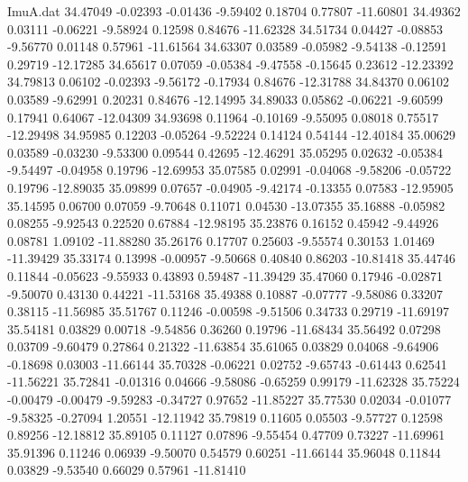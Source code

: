 \begin{filecontents}{ImuA.dat}
  34.47049   -0.02393   -0.01436   -9.59402    0.18704    0.77807  -11.60801
  34.49362    0.03111   -0.06221   -9.58924    0.12598    0.84676  -11.62328
  34.51734    0.04427   -0.08853   -9.56770    0.01148    0.57961  -11.61564
  34.63307    0.03589   -0.05982   -9.54138   -0.12591    0.29719  -12.17285
  34.65617    0.07059   -0.05384   -9.47558   -0.15645    0.23612  -12.23392
  34.79813    0.06102   -0.02393   -9.56172   -0.17934    0.84676  -12.31788
  34.84370    0.06102    0.03589   -9.62991    0.20231    0.84676  -12.14995
  34.89033    0.05862   -0.06221   -9.60599    0.17941    0.64067  -12.04309
  34.93698    0.11964   -0.10169   -9.55095    0.08018    0.75517  -12.29498
  34.95985    0.12203   -0.05264   -9.52224    0.14124    0.54144  -12.40184
  35.00629    0.03589   -0.03230   -9.53300    0.09544    0.42695  -12.46291
  35.05295    0.02632   -0.05384   -9.54497   -0.04958    0.19796  -12.69953
  35.07585    0.02991   -0.04068   -9.58206   -0.05722    0.19796  -12.89035
  35.09899    0.07657   -0.04905   -9.42174   -0.13355    0.07583  -12.95905
  35.14595    0.06700    0.07059   -9.70648    0.11071    0.04530  -13.07355
  35.16888   -0.05982    0.08255   -9.92543    0.22520    0.67884  -12.98195
  35.23876    0.16152    0.45942   -9.44926    0.08781    1.09102  -11.88280
  35.26176    0.17707    0.25603   -9.55574    0.30153    1.01469  -11.39429
  35.33174    0.13998   -0.00957   -9.50668    0.40840    0.86203  -10.81418
  35.44746    0.11844   -0.05623   -9.55933    0.43893    0.59487  -11.39429
  35.47060    0.17946   -0.02871   -9.50070    0.43130    0.44221  -11.53168
  35.49388    0.10887   -0.07777   -9.58086    0.33207    0.38115  -11.56985
  35.51767    0.11246   -0.00598   -9.51506    0.34733    0.29719  -11.69197
  35.54181    0.03829    0.00718   -9.54856    0.36260    0.19796  -11.68434
  35.56492    0.07298    0.03709   -9.60479    0.27864    0.21322  -11.63854
  35.61065    0.03829    0.04068   -9.64906   -0.18698    0.03003  -11.66144
  35.70328   -0.06221    0.02752   -9.65743   -0.61443    0.62541  -11.56221
  35.72841   -0.01316    0.04666   -9.58086   -0.65259    0.99179  -11.62328
  35.75224   -0.00479   -0.00479   -9.59283   -0.34727    0.97652  -11.85227
  35.77530    0.02034   -0.01077   -9.58325   -0.27094    1.20551  -12.11942
  35.79819    0.11605    0.05503   -9.57727    0.12598    0.89256  -12.18812
  35.89105    0.11127    0.07896   -9.55454    0.47709    0.73227  -11.69961
  35.91396    0.11246    0.06939   -9.50070    0.54579    0.60251  -11.66144
  35.96048    0.11844    0.03829   -9.53540    0.66029    0.57961  -11.81410

\end{filecontents}
